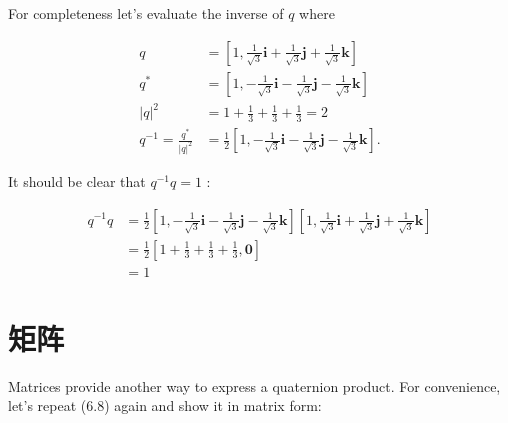     For completeness let's evaluate the inverse of $q$ where

    $$
        \begin{aligned}
            q                            & =\left[1, \frac{1}{\sqrt{3}} \mathbf{i}+\frac{1}{\sqrt{3}} \mathbf{j}+\frac{1}{\sqrt{3}} \mathbf{k}\right]              \\
            q^{*}                        & =\left[1,-\frac{1}{\sqrt{3}} \mathbf{i}-\frac{1}{\sqrt{3}} \mathbf{j}-\frac{1}{\sqrt{3}} \mathbf{k}\right]              \\
            |q|^{2}                      & =1+\frac{1}{3}+\frac{1}{3}+\frac{1}{3}=2                                                                                \\
            q^{-1}=\frac{q^{*}}{|q|^{2}} & =\frac{1}{2}\left[1,-\frac{1}{\sqrt{3}} \mathbf{i}-\frac{1}{\sqrt{3}} \mathbf{j}-\frac{1}{\sqrt{3}} \mathbf{k}\right] .
        \end{aligned}
    $$

    It should be clear that $q^{-1} q=1$ :

    $$
        \begin{aligned}
            q^{-1} q & =\frac{1}{2}\left[1,-\frac{1}{\sqrt{3}} \mathbf{i}-\frac{1}{\sqrt{3}} \mathbf{j}-\frac{1}{\sqrt{3}} \mathbf{k}\right]\left[1, \frac{1}{\sqrt{3}} \mathbf{i}+\frac{1}{\sqrt{3}} \mathbf{j}+\frac{1}{\sqrt{3}} \mathbf{k}\right] \\
                     & =\frac{1}{2}\left[1+\frac{1}{3}+\frac{1}{3}+\frac{1}{3}, \mathbf{0}\right]                                                                                                                                                     \\
                     & =1
        \end{aligned}
    $$

    \section{矩阵}
    Matrices provide another way to express a quaternion product. For convenience, let's repeat (6.8) again and show it in matrix form:

